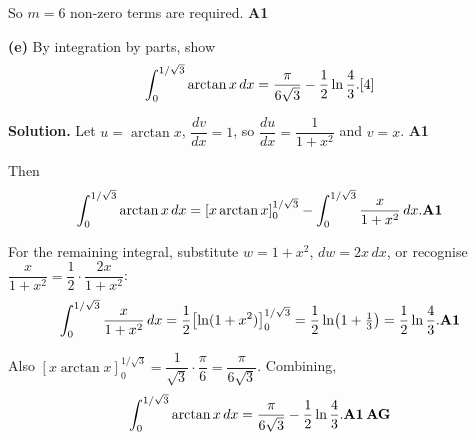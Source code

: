 \documentclass[12pt, twoside]{article}
\begin{document}
\begin{enumerate}[itemsep=0.3cm]
So $m = 6$ non-zero terms are required. \hfill \textbf{A1}

\medskip

\textbf{(e)} By integration by parts, show
\[
\int_{0}^{1/\sqrt{3}} \arctan x\, dx
= \frac{\pi}{6\sqrt{3}} - \frac{1}{2}\ln\frac{4}{3}. \hfill [4]
\]

\textbf{Solution.} Let $u = \arctan x$, $\dfrac{dv}{dx} = 1$, so
$\dfrac{du}{dx} = \dfrac{1}{1+x^2}$ and $v = x$. \hfill \textbf{A1}

Then
\[
\int_{0}^{1/\sqrt{3}} \arctan x\, dx
= \left[x \arctan x\right]_{0}^{1/\sqrt{3}}
- \int_{0}^{1/\sqrt{3}} \frac{x}{1 + x^{2}}\, dx. \hfill \textbf{A1}
\]

For the remaining integral, substitute $w = 1 + x^2$, $dw = 2x\, dx$,
or recognise $\dfrac{x}{1+x^2} = \dfrac{1}{2}\cdot\dfrac{2x}{1+x^2}$:
\[
\int_{0}^{1/\sqrt{3}} \frac{x}{1 + x^{2}}\, dx
= \frac{1}{2}\!\left[\ln(1 + x^{2})\right]_{0}^{1/\sqrt{3}}
= \frac{1}{2}\ln\!\left(1 + \tfrac{1}{3}\right)
= \frac{1}{2}\ln\frac{4}{3}. \hfill \textbf{A1}
\]

Also $\left[x \arctan x\right]_{0}^{1/\sqrt{3}}
= \dfrac{1}{\sqrt{3}} \cdot \dfrac{\pi}{6} = \dfrac{\pi}{6\sqrt{3}}$.
Combining,
\[
\int_{0}^{1/\sqrt{3}} \arctan x\, dx
= \frac{\pi}{6\sqrt{3}} - \frac{1}{2}\ln\frac{4}{3}. \hfill \textbf{A1\,AG}
\]

\end{enumerate}
\end{document}
